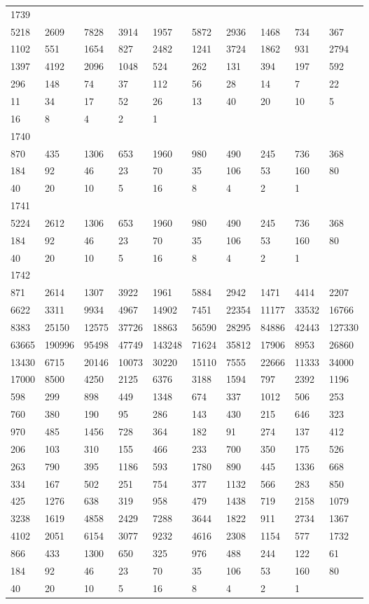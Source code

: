 \begin{longtable}{*{10}{l}}
1739&&&&&&&&&\\
5218& 2609& 7828& 3914& 1957& 5872& 2936& 1468& 734& 367\\
1102& 551& 1654& 827& 2482& 1241& 3724& 1862& 931& 2794\\
1397& 4192& 2096& 1048& 524& 262& 131& 394& 197& 592\\
296& 148& 74& 37& 112& 56& 28& 14& 7& 22\\
11& 34& 17& 52& 26& 13& 40& 20& 10& 5\\
16& 8& 4& 2& 1& \\

1740&&&&&&&&&\\
870& 435& 1306& 653& 1960& 980& 490& 245& 736& 368\\
184& 92& 46& 23& 70& 35& 106& 53& 160& 80\\
40& 20& 10& 5& 16& 8& 4& 2& 1& \\

1741&&&&&&&&&\\
5224& 2612& 1306& 653& 1960& 980& 490& 245& 736& 368\\
184& 92& 46& 23& 70& 35& 106& 53& 160& 80\\
40& 20& 10& 5& 16& 8& 4& 2& 1& \\

1742&&&&&&&&&\\
871& 2614& 1307& 3922& 1961& 5884& 2942& 1471& 4414& 2207\\
6622& 3311& 9934& 4967& 14902& 7451& 22354& 11177& 33532& 16766\\
8383& 25150& 12575& 37726& 18863& 56590& 28295& 84886& 42443& 127330\\
63665& 190996& 95498& 47749& 143248& 71624& 35812& 17906& 8953& 26860\\
13430& 6715& 20146& 10073& 30220& 15110& 7555& 22666& 11333& 34000\\
17000& 8500& 4250& 2125& 6376& 3188& 1594& 797& 2392& 1196\\
598& 299& 898& 449& 1348& 674& 337& 1012& 506& 253\\
760& 380& 190& 95& 286& 143& 430& 215& 646& 323\\
970& 485& 1456& 728& 364& 182& 91& 274& 137& 412\\
206& 103& 310& 155& 466& 233& 700& 350& 175& 526\\
263& 790& 395& 1186& 593& 1780& 890& 445& 1336& 668\\
334& 167& 502& 251& 754& 377& 1132& 566& 283& 850\\
425& 1276& 638& 319& 958& 479& 1438& 719& 2158& 1079\\
3238& 1619& 4858& 2429& 7288& 3644& 1822& 911& 2734& 1367\\
4102& 2051& 6154& 3077& 9232& 4616& 2308& 1154& 577& 1732\\
866& 433& 1300& 650& 325& 976& 488& 244& 122& 61\\
184& 92& 46& 23& 70& 35& 106& 53& 160& 80\\
40& 20& 10& 5& 16& 8& 4& 2& 1& \\


\end{longtable}

